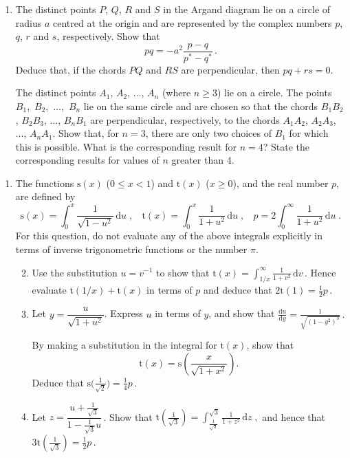 \documentclass[a4, 11pt]{report}
\newlength{\qspace}
\newcounter{qnumber}
\newenvironment{question}%
 {\vspace{\qspace}
  \begin{enumerate}[\bfseries 1\quad][10]%
    \setcounter{enumi}{\value{qnumber}}%
    \item%
 }
{
  \end{enumerate}
  \filbreak
  \stepcounter{qnumber}
 }
\newenvironment{questionparts}[1][1]%
 {
  \begin{enumerate}[\bfseries (i)]%
    \setcounter{enumii}{#1}
    \addtocounter{enumii}{-1}
    \setlength{\itemsep}{5mm}
    \setlength{\parskip}{8pt}
 }
 {
  \end{enumerate}
 }
\def\d{{\mathrm d}}
\def\s{{\mathrm s}}
\def\t{{\mathrm t}}
\def\le{\leqslant}
\def\ge{\geqslant}
\newcommand{\ds}{\displaystyle}
\begin{document}
\begin{question}
The distinct points $P$, $Q$, $R$ and $S$ in the Argand diagram
lie on a circle of radius $a$ centred at the origin and are represented
by the complex numbers $p$, $q$, $r$ and $s$, respectively.
Show that 
\[
pq = -a^2 \frac {p-q}{p^*-q^*}\,.
\]
Deduce that, if the chords
$PQ$ and $RS$ are perpendicular, then $pq+rs=0$.

The distinct
points $A_1$, $A_2$, $\ldots$, $A_n$ (where $n\ge3$) lie on a circle. The 
points
\hbox{$B_1$, $B_2$, $\ldots$, $B_{n}$} lie on the same circle and are chosen 
so that the chords $B_1B_2$, $B_2B_3$,  $\ldots$, $B_nB_{1}$
are perpendicular, respectively, to the chords 
$A_1A_2$, $A_2A_3$,  $\ldots$, $A_nA_1$.
Show that, for  $n=3$, there are only two choices of $B_1$
for which this is possible. What is the corresponding result for $n=4$?
State the corresponding results  for values of $n$ greater than 4.
\end{question}
	
\begin{question}
The functions $\s(x)$ ($0\le x<1$) and $\t(x)$ ($x\ge0$), 
and the real number $p$, are defined 
by
\[
\s(x) = \int_0^x \frac 1  {\sqrt{1-u^2}}\, \d u\;, \ \ \ \ 
\t(x) = \int_0^x \frac 1  {1+u^2}\, \d u\;, \ \ \ \ 
p= 2 \int_0^\infty \frac 1 {1+u^2}\, \d u \;.
\]  
For this question,
do not evaluate any of the above integrals explicitly in terms of 
inverse trigonometric functions or the number $\pi$.

\begin{questionparts}
\item  Use the substitution $u=v^{-1}$ to show that
$\ds \t(x) =\int_{1/x}^\infty\frac 1 {1+v^2}\, \d v \, $. Hence evaluate
$\t(1/x) + \t(x)$ in terms of $p$ and deduce that 
$2\t(1)= \frac12 p\,$.

\item 
Let 
$y=\dfrac{u}{\sqrt{1+u^2}}$\;. Express $u$ in terms  of $y$,
and show that 
$
\ds
\frac{\d u}{\d y} = \frac 1 {\sqrt{(1-y^2)^3}}\,.
$

By making a substitution  in the integral for $\t(x)$, show that
\[
\t(x) = \s\left(\frac{x}{\sqrt{1+x^2}}\right)\!.
\]
Deduce that $\s\big(\frac1{\sqrt2}\big) =\frac1 4 p\,$.

\item Let
$z= \dfrac{u+ \frac1{\sqrt3}}{1-\frac 1{\sqrt3}u}\,$.
  Show
that 
$\ds
\t(\tfrac1{\sqrt3}) = \int_{\frac1{\sqrt3}}^{\sqrt3} \frac1 {1+z^2} \,\d z\;,
$
and
hence  that $3\t(\frac1{\sqrt3}) = \frac12 p\,$.
\end{questionparts}
\end{question}
		
\end{document}
